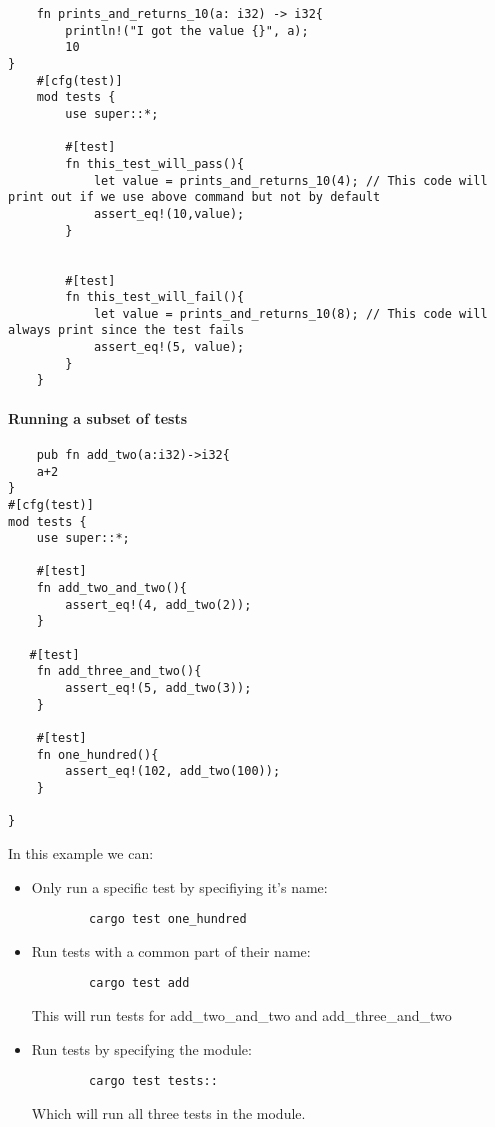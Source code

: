 \begin{lstlisting}
    fn prints_and_returns_10(a: i32) -> i32{
        println!("I got the value {}", a);
        10
}
    #[cfg(test)]
    mod tests {
        use super::*;
    
        #[test]
        fn this_test_will_pass(){
            let value = prints_and_returns_10(4); // This code will print out if we use above command but not by default
            assert_eq!(10,value);
        }
    
    
        #[test]
        fn this_test_will_fail(){
            let value = prints_and_returns_10(8); // This code will always print since the test fails
            assert_eq!(5, value);
        }
    }       
\end{lstlisting}

\paragraph{Running a subset of tests}\begin{lstlisting}
    pub fn add_two(a:i32)->i32{
    a+2
}
#[cfg(test)]
mod tests {
    use super::*;

    #[test]
    fn add_two_and_two(){
        assert_eq!(4, add_two(2));
    }
   
   #[test]
    fn add_three_and_two(){
        assert_eq!(5, add_two(3));
    }

    #[test]
    fn one_hundred(){
        assert_eq!(102, add_two(100));
    }

}
\end{lstlisting}

In this example we can:\begin{itemize}
    \item Only run a specific test by specifiying it's name:\begin{lstlisting}
        cargo test one_hundred 
    \end{lstlisting}
    \item Run tests with a common part of their name:\begin{lstlisting}
        cargo test add
    \end{lstlisting}
    This will run tests for add\_two\_and\_two and add\_three\_and\_two
    \item Run tests by specifying the module:\begin{lstlisting}
        cargo test tests::
    \end{lstlisting}
    Which will run all three tests in the module. 
\end{itemize}

